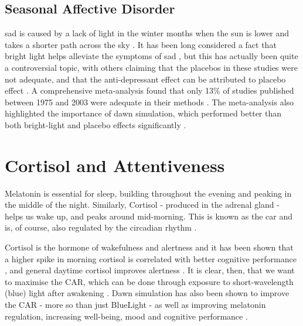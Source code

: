 \subsection{Seasonal Affective Disorder}

\acrfull{sad} is caused by a lack of light in the winter months when the sun is lower and takes a shorter path across the sky \citep{eastmanNaturalSummerWinter1990}. It has been long considered a fact that bright light helps alleviate the symptoms of \acrshort{sad} \citep{magnussonTreatmentSeasonalAffective1991, leeSpectralPropertiesPhototherapy1997,eastmanBrightLightTreatment1998}, but this has actually been quite a controversial topic, with others claiming that the placebos in these studies were not adequate, and that the anti-depressant effect can be attributed to placebo effect \citep{eastman26ComparisonTwo1993}. A comprehensive meta-analysis found that only 13\% of studies published between 1975 and 2003 were adequate in their methods \citep{goldenEfficacyLightTherapy2005}. The meta-analysis also highlighted the importance of dawn simulation, which performed better than both bright-light and placebo effects significantly \citet{averyDawnSimulationBright2001}.


\section{Cortisol and Attentiveness}
\label{Sec:Cortisol}

Melatonin is essential for sleep, building throughout the evening and peaking in the middle of the night. Similarly, Cortisol - produced in the adrenal gland - helps us wake up, and peaks around mid-morning. This is known as the \acrfull{car} and is, of course, also regulated by the circadian rhythm \citep{friesCortisolAwakeningResponse2009}.

Cortisol is the hormone of wakefulness and alertness and it has been shown that a higher spike in morning cortisol is correlated with better cognitive performance \citep{evansDiurnalCortisolCycle2011}, and general daytime cortisol improves alertness \citep{chapototCortisolSecretionRelated1998}. It is clear, then, that we want to maximise the CAR, which can be done through exposure to short-wavelength (blue) light after awakening \citep{figueiroShortWavelengthLightEnhances2012}. Dawn simulation has also been shown to improve the CAR - more so than just \gls{BlueLight} - as well as improving melatonin regulation, increasing well-being, mood and cognitive performance \citep{gabelEffectsArtificialDawn2013}.


